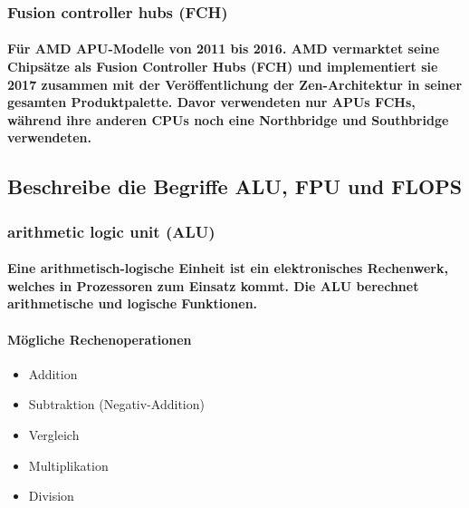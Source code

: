 \documentclass[a4paper]{article}
\begin{document}
    \subsubsection{\color{codegreen}Fusion controller hubs (FCH)}

    \paragraph{\color{codegreen}{\fbseries Die Fusion Controller Hubs ähneln in ihrer Funktion dem Platform Controller Hub (PCH) von Intel. } Für AMD APU-Modelle von 2011 bis 2016. AMD vermarktet seine Chipsätze als Fusion Controller Hubs (FCH) und implementiert sie 2017 zusammen mit der Veröffentlichung der Zen-Architektur in seiner gesamten Produktpalette. Davor verwendeten nur APUs FCHs, während ihre anderen CPUs noch eine Northbridge und Southbridge verwendeten.}

    \subsection{\color{red}Beschreibe die Begriffe ALU, FPU und FLOPS}\label{subsec:beschreibe-die-begriffe-alu-fpu-und-flops}

    \subsubsection{\color{codegreen}arithmetic logic unit (ALU)}

    \paragraph{\color{codegreen} Eine arithmetisch-logische Einheit ist ein elektronisches Rechenwerk, welches in Prozessoren zum Einsatz kommt. { \fbseries Die ALU berechnet arithmetische und logische Funktionen.}}

    \paragraph{\color{red}Mögliche Rechenoperationen}
    \begin{itemize}
        \color{magenta}
        \item Addition
        \item Subtraktion (Negativ-Addition)
        \item Vergleich
        \item Multiplikation
        \item Division
    \end{itemize}
\end{document}
